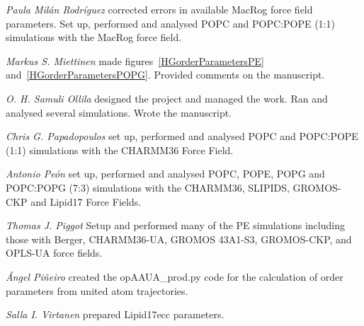 \documentclass[journal=jpcbfk]{achemso}
\begin{document}
\noindent
{\it Paula Mil{\'a}n Rodr{\'i}guez} corrected errors in available MacRog force field parameters. Set up, performed and analysed POPC and POPC:POPE (1:1) simulations with the MacRog force field.

\noindent
{\it Markus S. Miettinen}
made figures~\ref{HGorderParametersPE} and~\ref{HGorderParametersPOPG}. Provided comments on the manuscript.

\noindent
{\it O. H. Samuli Ollila}
designed the project and managed the work.
Ran and analysed several simulations. Wrote the manuscript.

\noindent
{\it Chris G. Papadopoulos} set up, performed and analysed POPC and POPC:POPE (1:1) simulations with the CHARMM36 Force Field.

\noindent
{\it Antonio Pe{\'o}n} set up, performed and analysed POPC, POPE, POPG and POPC:POPG (7:3) simulations with the CHARMM36, SLIPIDS, GROMOS-CKP and Lipid17 Force Fields.

\noindent
{\it Thomas J. Piggot}
Setup and performed many of the PE simulations including those with Berger, CHARMM36-UA, GROMOS 43A1-S3, GROMOS-CKP, and OPLS-UA force fields.

\noindent
{\it {\'A}ngel Pi{\~n}eiro}
created the opAAUA\_prod.py code for the calculation of order parameters from united atom trajectories.

\noindent
{\it Salla I. Virtanen}
prepared Lipid17ecc parameters.


\end{document}
